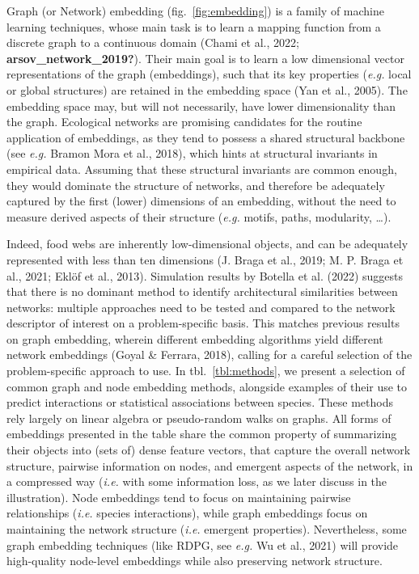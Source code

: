 \documentclass[10pt,oneside]{article}
\begin{document}
Graph (or Network) embedding (fig.~\ref{fig:embedding}) is a family of
machine learning techniques, whose main task is to learn a mapping
function from a discrete graph to a continuous domain (Chami et al.,
2022; \textbf{arsov\_network\_2019?}). Their main goal is to learn a low
dimensional vector representations of the graph (embeddings), such that
its key properties (\emph{e.g.} local or global structures) are retained
in the embedding space (Yan et al., 2005). The embedding space may, but
will not necessarily, have lower dimensionality than the graph.
Ecological networks are promising candidates for the routine application
of embeddings, as they tend to possess a shared structural backbone (see
\emph{e.g.} Bramon Mora et al., 2018), which hints at structural
invariants in empirical data. Assuming that these structural invariants
are common enough, they would dominate the structure of networks, and
therefore be adequately captured by the first (lower) dimensions of an
embedding, without the need to measure derived aspects of their
structure (\emph{e.g.} motifs, paths, modularity, \ldots).

Indeed, food webs are inherently low-dimensional objects, and can be
adequately represented with less than ten dimensions (J. Braga et al.,
2019; M. P. Braga et al., 2021; Eklöf et al., 2013). Simulation results
by Botella et al. (2022) suggests that there is no dominant method to
identify architectural similarities between networks: multiple
approaches need to be tested and compared to the network descriptor of
interest on a problem-specific basis. This matches previous results on
graph embedding, wherein different embedding algorithms yield different
network embeddings (Goyal \& Ferrara, 2018), calling for a careful
selection of the problem-specific approach to use. In
tbl.~\ref{tbl:methods}, we present a selection of common graph and node
embedding methods, alongside examples of their use to predict
interactions or statistical associations between species. These methods
rely largely on linear algebra or pseudo-random walks on graphs. All
forms of embeddings presented in the table share the common property of
summarizing their objects into (sets of) dense feature vectors, that
capture the overall network structure, pairwise information on nodes,
and emergent aspects of the network, in a compressed way (\emph{i.e.}
with some information loss, as we later discuss in the illustration).
Node embeddings tend to focus on maintaining pairwise relationships
(\emph{i.e.} species interactions), while graph embeddings focus on
maintaining the network structure (\emph{i.e.} emergent properties).
Nevertheless, some graph embedding techniques (like RDPG, see
\emph{e.g.} Wu et al., 2021) will provide high-quality node-level
embeddings while also preserving network structure.
\end{document}
